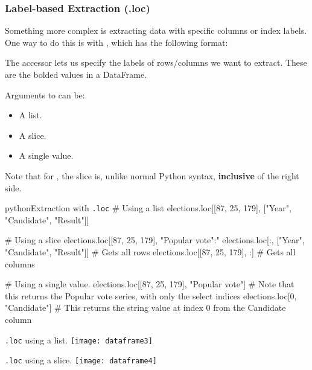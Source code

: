 \documentclass[openany]{book}
\begin{document}
\subsubsection{Label-based Extraction (.loc)}
Something more complex is extracting data with specific columns or index labels. One way to do this is with , which has the following format:
\begin{center}
\end{center}

The  accessor lets us specify the labels of rows/columns we want to extract. These are the bolded values in a DataFrame.

Arguments to  can be:
\begin{itemize}
	\item A list.
	\item A slice.
	\item A single value.
\end{itemize}
\begin{warn}
	Note that for , the slice is, unlike normal Python syntax, \textbf{inclusive} of the right side.
\end{warn}

\begin{code}{python}{Extraction with \texttt{.loc}}
	# Using a list
	elections.loc[[87, 25, 179], ["Year", "Candidate", "Result"]]
	
	# Using a slice
	elections.loc[[87, 25, 179], "Popular vote":"%
	elections.loc[:, ["Year", "Candidate", "Result"]] # Gets all rows
	elections.loc[[87, 25, 179], :] # Gets all columns
	
	# Using a single value.
	elections.loc[[87, 25, 179], "Popular vote"] # Note that this returns the Popular vote series, with only the select indices
	elections.loc[0, "Candidate"] # This returns the string value at index 0 from the Candidate column
\end{code}

\begin{figurebox}{\texttt{.loc} using a list.}
	\centering\texttt{[image: dataframe3]}
\end{figurebox}

\begin{figurebox}{\texttt{.loc} using a slice.}
	\centering\texttt{[image: dataframe4]}
\end{figurebox}
\end{document}
